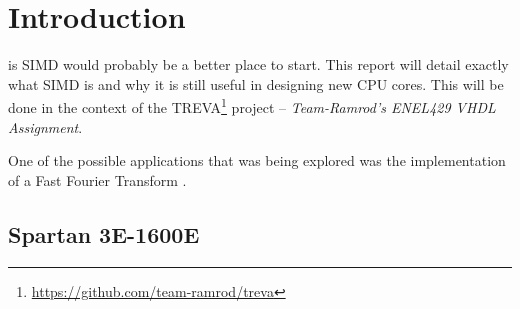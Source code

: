 \section{Introduction}

 is SIMD would probably be a better place to start.  This
report will detail exactly what SIMD is and why it is still useful in designing
new CPU cores.  This will be done in the context of the
TREVA\footnote{\url{https://github.com/team-ramrod/treva}} project --
\emph{Team-Ramrod's ENEL429 VHDL Assignment}.

One of the possible applications that was being explored was the implementation
of a Fast Fourier Transform \cite{Jamieson198648}.


\subsection{Spartan 3E-1600E}

